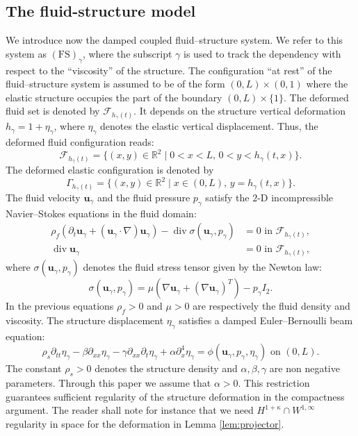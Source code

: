 \documentclass[11pt]{article}
\let\mathcal\mathscr
\newcommand{\FS}{\mathrm{FS}}
\theoremstyle{remark}
\theoremstyle{definition}
\newcommand{\Real}{\mathbb{R}}
\newcommand{\ug}{\boldsymbol{u}}
\DeclareMathOperator{\DIV}{div}
\begin{document}
\subsection{The fluid-structure model}
We introduce now the damped coupled fluid--structure system. We refer to
this system as $(\FS)_{\gamma}$, where the subscript $\gamma$ is used to track the dependency with respect to the ``viscosity'' of the structure. The configuration ``at rest'' of the fluid--structure system is assumed to be of the form $(0, L)\times (0, 1)$ where the elastic structure occupies the part of the boundary $(0, L)\times \{1\}$. The deformed fluid set is denoted by $\mathcal{F}_{h_{\gamma}(t)}$. It depends on the structure vertical deformation $h_{\gamma}=1+\eta_\gamma$, where $\eta_\gamma$ denotes the elastic vertical displacement.
Thus, the deformed fluid configuration reads:\vspace*{-3pt}\enlargethispage{.5\baselineskip}%
\begin{equation}\label{fluid.domain}
\mathcal{F}_{h_{\gamma}(t)}=\{(x,y)\in\mathbb{R}^{2}\mid 0<x<L,\,0<y<h_{\gamma}(t,x)\}.
\end{equation}
The deformed elastic configuration is denoted by
\[
\Gamma_{h_{\gamma}(t)}=\{(x,y)\in\Real^{2}\mid x\in(0,L),\,y=h_{\gamma}(t,x)\}.
\]
The fluid velocity $\ug_{\gamma}$ and the fluid pressure $p_{\gamma}$ satisfy the $2$-D incompressible Navier--Stokes equations in the fluid domain:
\begin{equation}\label{Navier-Stokes}
\begin{aligned}
\rho_{f}(\partial_{t}\ug_{\gamma} + (\ug_{\gamma}\cdot\nabla)\ug_{\gamma}) - \DIV{\sigma(\ug_{\gamma},p_{\gamma})} &{}= 0\text{ in }\mathcal{F}_{h_{\gamma}(t)},\\
\DIV{\ug_{\gamma}}&{}=0\text{ in }\mathcal{F}_{h_{\gamma}(t)},
\end{aligned}
\end{equation}
where $\sigma(\ug_{\gamma},p_{\gamma})$ denotes the fluid stress tensor given by the Newton law:
\[\sigma(\ug_{\gamma},p_{\gamma})=\mu(\nabla\ug_{\gamma} +( \nabla\ug_{\gamma})^{T}) -p_{\gamma}I_{2}.\]
In the previous equations $\rho_{f}>0$ and $\mu>0$ are respectively the fluid density and viscosity. The structure displacement $\eta_{\gamma}$ satisfies a damped Euler--Bernoulli beam equation:\vspace*{-3pt}
\begin{equation}\label{Beam.equation}
\rho_{s}\partial_{tt}\eta_{\gamma}-\beta\partial_{xx}\eta_{\gamma}-\gamma\partial_{xx}\partial_{t}\eta_{\gamma}+\alpha\partial_{x}^4\eta_{\gamma}=\phi(\ug_{\gamma},p_{\gamma},\eta_{\gamma})\text{ on }(0,L).
\end{equation}
The constant $\rho_{s}>0$ denotes the structure density and $\alpha,\beta,\gamma$ are non negative parameters.
Through this paper we assume that $\alpha>0$.
This restriction guarantees sufficient regularity of the structure deformation in the compactness argument. The reader shall note for instance that we need $H^{1+\kappa} \cap W^{1,\infty}$ regularity in space for the deformation in Lemma \ref{lem:projector}.
\end{document}
